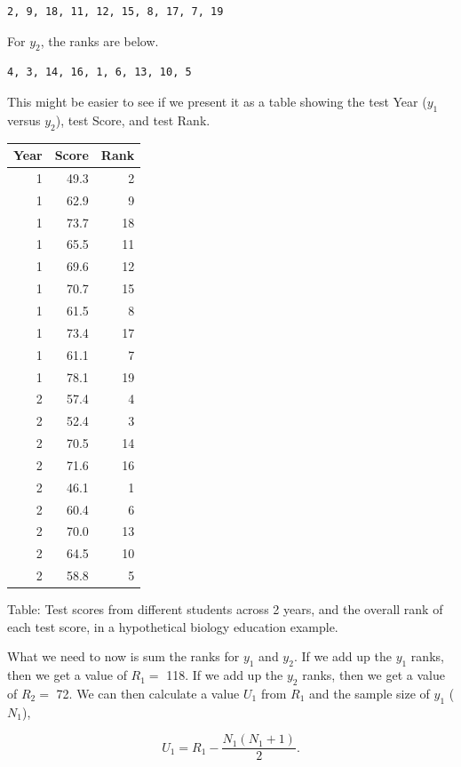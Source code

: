 \documentclass[
]{scrbook}
\begin{document}
\begin{verbatim}
2, 9, 18, 11, 12, 15, 8, 17, 7, 19
\end{verbatim}

For \(y_{2}\), the ranks are below.

\begin{verbatim}
4, 3, 14, 16, 1, 6, 13, 10, 5
\end{verbatim}

This might be easier to see if we present it as a table showing the test Year (\(y_{1}\) versus \(y_{2}\)), test Score, and test Rank.

\begin{tabular}{r|r|r}
\hline
Year & Score & Rank\\
\hline
1 & 49.3 & 2\\
\hline
1 & 62.9 & 9\\
\hline
1 & 73.7 & 18\\
\hline
1 & 65.5 & 11\\
\hline
1 & 69.6 & 12\\
\hline
1 & 70.7 & 15\\
\hline
1 & 61.5 & 8\\
\hline
1 & 73.4 & 17\\
\hline
1 & 61.1 & 7\\
\hline
1 & 78.1 & 19\\
\hline
2 & 57.4 & 4\\
\hline
2 & 52.4 & 3\\
\hline
2 & 70.5 & 14\\
\hline
2 & 71.6 & 16\\
\hline
2 & 46.1 & 1\\
\hline
2 & 60.4 & 6\\
\hline
2 & 70.0 & 13\\
\hline
2 & 64.5 & 10\\
\hline
2 & 58.8 & 5\\
\hline
\end{tabular}

Table: Test scores from different students across 2 years, and the overall rank of each test score, in a hypothetical biology education example.

What we need to now is sum the ranks for \(y_{1}\) and \(y_{2}\).
If we add up the \(y_{1}\) ranks, then we get a value of \(R_{1}=\) 118.
If we add up the \(y_{2}\) ranks, then we get a value of \(R_{2}=\) 72.
We can then calculate a value \(U_{1}\) from \(R_{1}\) and the sample size of \(y_{1}\) (\(N_{1}\)),

\[U_{1} = R_{1} - \frac{N_{1}\left(N_{1} + 1 \right)}{2}.\]
\end{document}
